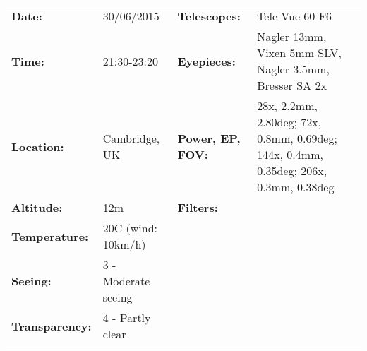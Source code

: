 \begin{tabular}{ p{0.9in} p{1.3in} p{1.2in} p{5.2in}}
{\bf Date:} & 30/06/2015 & {\bf Telescopes:} & Tele Vue 60 F6 \\ 
{\bf Time:} & 21:30-23:20 & {\bf Eyepieces:} & Nagler 13mm, Vixen 5mm SLV, Nagler 3.5mm, Bresser SA 2x \\ 
{\bf Location:} & Cambridge, UK & {\bf Power, EP, FOV:} & 28x, 2.2mm, 2.80deg; 72x, 0.8mm, 0.69deg; 144x, 0.4mm, 0.35deg; 206x, 0.3mm, 0.38deg \\ 
{\bf Altitude:} & 12m & {\bf Filters:} &  \\ 
{\bf Temperature:} & 20C (wind: 10km/h) & & \\ 
{\bf Seeing:} & 3 - Moderate seeing & & \\ 
{\bf Transparency:} & 4 - Partly clear & & \\ 
\end{tabular}
